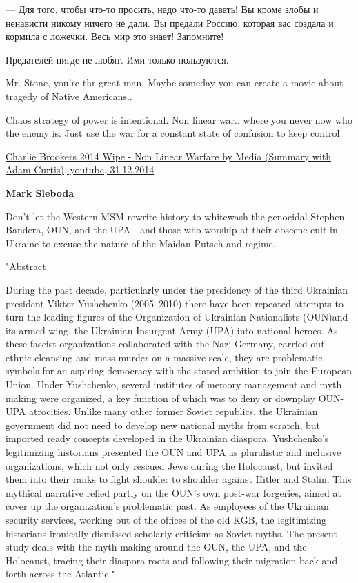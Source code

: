 \begin{itemize}
— Для того, чтобы что-то просить, надо что-то давать! Вы кроме злобы и
ненависти никому ничего не дали. Вы предали Россию, которая вас создала и
кормила с ложечки. Весь мир это знает! Запомните!

Предателей нигде не любят. Ими только пользуются.


Mr. Stone, you're thr great man. Maybe someday you can create a movie about
tragedy of Native Americans..


Chaos strategy of power is intentional. Non linear war.. where you never now
who the enemy is. Just use the war for a constant state of confusion to keep
control. 

\href{https://www.youtube.com/watch?v=KOY4Ka-GBus}{%
Charlie Brookers 2014 Wipe - Non Linear Warfare by Media (Summary with Adam Curtis), youtube, %
31.12.2014%
}

\textbf{Mark Sleboda}

Don't let the Western MSM rewrite history to whitewash the genocidal Stephen
Bandera, OUN, and the UPA - and those who worship at their obscene cult in
Ukraine to excuse the nature of the Maidan Putsch and regime.

"Abstract

During the past decade, particularly under the presidency of the third
Ukrainian president Viktor Yushchenko (2005–2010) there have been repeated
attempts to turn the leading ﬁgures of the Organization of Ukrainian
Nationalists (OUN)and its armed wing, the Ukrainian Insurgent Army (UPA) into
national heroes. As these fascist organizations collaborated with the Nazi
Germany, carried out ethnic cleansing and mass murder on a massive scale, they
are problematic symbols for an aspiring democracy with the stated ambition to
join the European Union. Under Yushchenko, several institutes of memory
management and myth making were organized, a key function of which was to deny
or downplay OUN-UPA atrocities. Unlike many other former Soviet republics, the
Ukrainian government did not need to develop new national myths from scratch,
but imported ready concepts developed in the Ukrainian diaspora. Yushchenko’s
legitimizing historians presented the OUN and UPA as pluralistic and inclusive
organizations, which not only rescued Jews during the Holocaust, but invited
them into their ranks to ﬁght shoulder to shoulder against Hitler and Stalin.
This mythical narrative relied partly on the OUN’s own post-war forgeries,
aimed at cover up the organization’s problematic past. As employees of the
Ukrainian security services, working out of the ofﬁces of the old KGB, the
legitimizing historians ironically dismissed scholarly criticism as Soviet
myths. The present study deals with the myth-making around the OUN, the UPA,
and the Holocaust, tracing their diaspora roots and following their migration
back and forth across the Atlantic."


\end{itemize}
